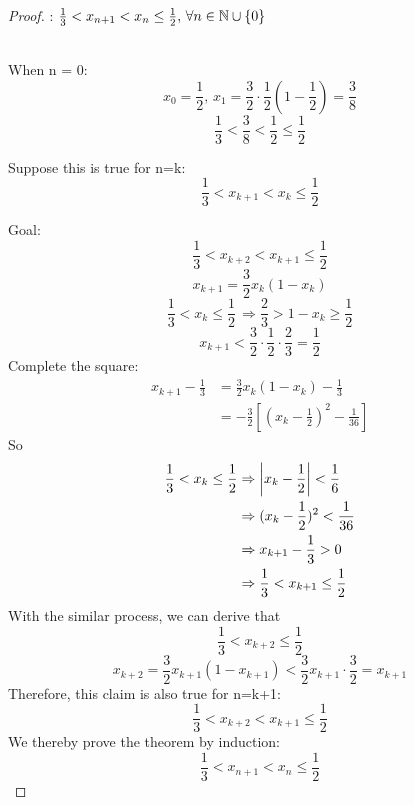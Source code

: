 \documentclass[a4paper,12pt]{article}
\begin{document}
\begin{proof}
    : \(\frac{1}{3}<x_{n+1}<x_n\le\frac{1}{2},\, \forall n \in \mathbb{N} \cup \left\{0\right\}\)\\\\

    When n = 0:
    \[x_0=\frac{1}{2},\, x_1 = \frac{3}{2}\cdot\frac{1}{2}(1-\frac{1}{2})=\frac{3}{8}\]
    \[\frac{1}{3}<\frac{3}{8}<\frac{1}{2}\le\frac{1}{2}\]

    Suppose this is true for n=k:
    \[\frac{1}{3}< x_{k+1}<x_k\le\frac{1}{2}\]

    Goal: \[\frac{1}{3}<x_{k+2}<x_{k+1}\le\frac{1}{2}\]
    \[x_{k+1} = \frac{3}{2}x_k(1-x_k)\]
    \[\frac{1}{3}<x_k\le\frac{1}{2}\,\Rightarrow\frac{2}{3}>1-x_k\ge\frac{1}{2}\]
    \[x_{k+1}<\frac{3}{2}\cdot\frac{1}{2}\cdot\frac{2}{3} = \frac{1}{2}\]
    Complete the square:
    \begin{align*}
        x_{k+1}-\frac{1}{3} & = \frac{3}{2}x_k(1-x_k)-\frac{1}{3}\\
        & = -\frac{3}{2}[(x_k-\frac{1}{2})^2-\frac{1}{36}]
    \end{align*}
    So
    \begin{align*}
        \frac{1}{3}<x_k\le\frac{1}{2}& \Rightarrow \left\lvert x_k-\frac{1}{2}\right\rvert<\frac{1}{6}\\
        & \Rightarrow (x_k-\frac{1}{2})^2<\frac{1}{36}\\
        & \Rightarrow x_{k+1}-\frac{1}{3}>0\\
        & \Rightarrow \frac{1}{3}<x_{k+1}\le\frac{1}{2}
    \end{align*}
    With the similar process, we can derive that 
    \[\frac{1}{3}<x_{k+2}\le\frac{1}{2}\]
    \[x_{k+2} = \frac{3}{2}x_{k+1}(1-x_{k+1})<\frac{3}{2}x_{k+1}\cdot\frac{3}{2}=x_{k+1}\]
    Therefore, this claim is also true for n=k+1: \[\frac{1}{3}<x_{k+2}<x_{k+1}\le\frac{1}{2}\]
    We thereby prove the theorem by induction: 
    \[\frac{1}{3}<x_{n+1}<x_n\le\frac{1}{2}\]
\end{proof}
\end{document}
